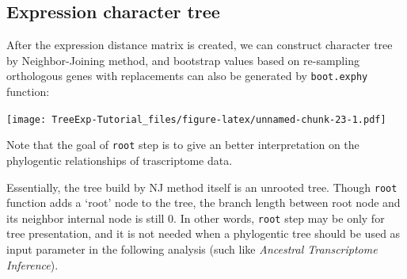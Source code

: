 \documentclass[]{book}
\newenvironment{Shaded}{\begin{snugshade}}{\end{snugshade}}
\newcommand{\DataTypeTok}[1]{\textcolor[rgb]{0.13,0.29,0.53}{#1}}
\newcommand{\DecValTok}[1]{\textcolor[rgb]{0.00,0.00,0.81}{#1}}
\newcommand{\KeywordTok}[1]{\textcolor[rgb]{0.13,0.29,0.53}{\textbf{#1}}}
\newcommand{\NormalTok}[1]{#1}
\newcommand{\OperatorTok}[1]{\textcolor[rgb]{0.81,0.36,0.00}{\textbf{#1}}}
\newcommand{\OtherTok}[1]{\textcolor[rgb]{0.56,0.35,0.01}{#1}}
\newcommand{\StringTok}[1]{\textcolor[rgb]{0.31,0.60,0.02}{#1}}
\begin{document}
\newpage

\hypertarget{expression-character-tree}{%
\subsection{Expression character tree}\label{expression-character-tree}}

After the expression distance matrix is created, we can construct character tree by Neighbor-Joining method, and bootstrap values based on re-sampling orthologous genes with replacements can also be generated by \texttt{boot.exphy} function:

\begin{Shaded}
\end{Shaded}

\texttt{[image: TreeExp-Tutorial\_files/figure-latex/unnamed-chunk-23-1.pdf]}

Note that the goal of \texttt{root} step is to give an better interpretation on the phylogentic relationships of trascriptome data.

Essentially, the tree build by NJ method itself is an unrooted tree. Though \texttt{root} function adds a `root' node to the tree, the branch length between root node and its neighbor internal node is still 0. In other words, \texttt{root} step may be only for tree presentation, and it is not needed when a phylogentic tree should be used as input parameter in the following analysis (such like \emph{Ancestral Transcriptome Inference}).
\end{document}
